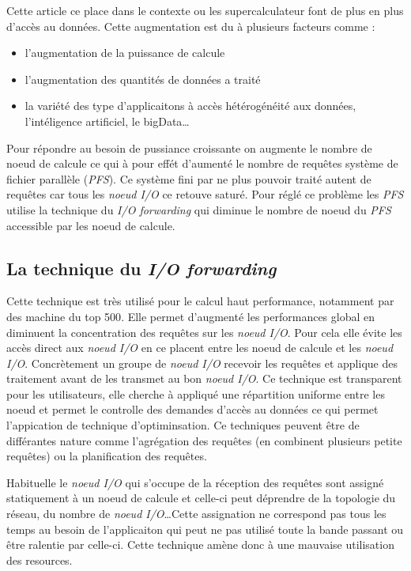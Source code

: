 \documentclass[10pt, a4paper]{article}
\begin{document}
Cette article ce place dans le contexte ou les supercalculateur font de plus en plus d'accès au données. Cette augmentation est du à plusieurs facteurs comme :
\begin{itemize}
  \item l'augmentation de la puissance de calcule
  \item l'augmentation des quantités de données a traité
  \item la variété des type d'applicaitons à accès hétérogénéité aux données, l'intéligence artificiel, le bigData\dots
\end{itemize}
Pour répondre au besoin de pussiance croissante on augmente le nombre de noeud de calcule ce qui à pour effét d'aumenté le nombre de requêtes système de fichier parallèle (\emph{PFS}). Ce système fini par ne plus pouvoir traité autent de requêtes car tous les \emph{noeud I/O} ce retouve saturé. Pour réglé ce problème les \emph{PFS} utilise la technique du \emph{I/O forwarding} qui diminue le nombre de noeud du \emph{PFS} accessible par les noeud de calcule.

\subsection{La technique du \emph{I/O forwarding}}

Cette technique est très utilisé pour le calcul haut performance, notamment par des machine du top 500\cite{}. Elle permet d'augmenté les performances global en diminuent la concentration des requêtes sur les \emph{noeud I/O}. Pour cela elle évite les accès direct aux \emph{noeud I/O} en ce placent entre les noeud de calcule et les \emph{noeud I/O}. Concrètement un groupe de \emph{noeud I/O} recevoir les requêtes et applique des traitement avant de les transmet au bon \emph{noeud I/O}. Ce technique est transparent pour les utilisateurs, elle cherche à appliqué une répartition uniforme entre les noeud et permet le controlle des demandes d'accès au données ce qui permet l'appication de technique d'optiminsation. Ce techniques peuvent être de différantes nature comme l'agrégation des requêtes (en combinent plusieurs petite requêtes) ou la planification des requêtes.

Habituelle le \emph{noeud I/O} qui s'occupe de la réception des requêtes sont assigné statiquement à un noeud de calcule et celle-ci peut déprendre de la topologie du réseau, du nombre de \emph{noeud I/O}\dots Cette assignation ne correspond pas tous les temps au besoin de l'applicaiton qui peut ne pas utilisé toute la bande passant ou être ralentie par celle-ci. Cette technique amène donc à une mauvaise utilisation des resources.
\end{document}
